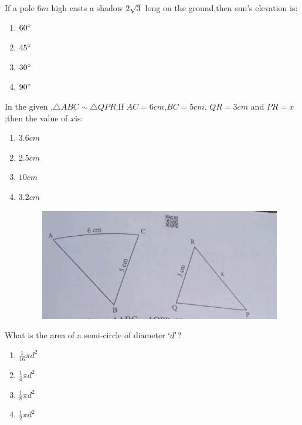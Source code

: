 %
    \item  If a pole $6 m$ high casts a shadow $2\sqrt{3}$  long on the ground,then sun's elevation is:
    \begin{enumerate}[label=(\alph*)]
        \item  $60\degree$
        \item  $45\degree$
        \item  $30\degree$
        \item  $90\degree$
    \end{enumerate}
    \item  In the given ,$\triangle ABC \sim  \triangle QPR$.If $AC= 6 cm$,$BC = 5 cm$, $QR = 3 cm$ and $PR=x$;then the value of $x$is:
        \begin{enumerate}[label=(\alph*)]
            \item  $3.6 cm$
            \item  $2.5 cm$
            \item  $10 cm$
            \item  $3.2 cm$
               \begin{figure}[H]
  \centering
  \includegraphics[width=\columnwidth]{figs/triangles.jpeg}
  \caption{}
  \label{fig:triangles.jpeg}
\end{figure}
        \end{enumerate}
        \pagebreak
    \item  What is the area of a semi-circle of diameter $\lq d \rq$?
    \begin{enumerate}[label=(\alph*)]
        \item  $\frac{1}{16}\pi d^2$
        \item  $\frac{1}{4} \pi d^2$
        \item  $\frac{1}{8}\pi d^2$
        \item  $\frac{1}{2}\pi d^2$
    \end{enumerate}
